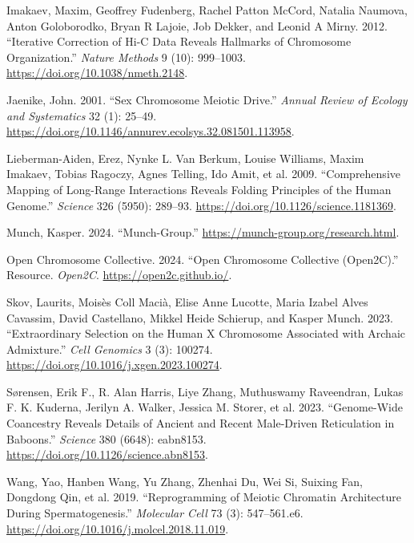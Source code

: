 \documentclass[
  a4paper,
]{scrbook}
\newlength{\cslhangindent}
\newenvironment{CSLReferences}[2] %
 {\begin{list}{}{%
  \setlength{\itemindent}{0pt}
  \setlength{\leftmargin}{0pt}
  \setlength{\parsep}{0pt}
  \ifodd #1
   \setlength{\leftmargin}{\cslhangindent}
   \setlength{\itemindent}{-1\cslhangindent}
  \fi
  \setlength{\itemsep}{#2\baselineskip}}}
 {\end{list}}
\let\oldemph\emph
\renewcommand\emph[1]{\oldemph{\color{gray}#1}}
\begin{document}
\label{refs}
\begin{CSLReferences}{1}{0}
Imakaev, Maxim, Geoffrey Fudenberg, Rachel Patton McCord, Natalia
Naumova, Anton Goloborodko, Bryan R Lajoie, Job Dekker, and Leonid A
Mirny. 2012. {``Iterative Correction of {Hi}-{C} Data Reveals Hallmarks
of Chromosome Organization.''} \emph{Nature Methods} 9 (10): 999--1003.
\url{https://doi.org/10.1038/nmeth.2148}.

Jaenike, John. 2001. {``Sex {Chromosome} {Meiotic} {Drive}.''}
\emph{Annual Review of Ecology and Systematics} 32 (1): 25--49.
\url{https://doi.org/10.1146/annurev.ecolsys.32.081501.113958}.

Lieberman-Aiden, Erez, Nynke L. Van Berkum, Louise Williams, Maxim
Imakaev, Tobias Ragoczy, Agnes Telling, Ido Amit, et al. 2009.
{``Comprehensive {Mapping} of {Long}-{Range} {Interactions} {Reveals}
{Folding} {Principles} of the {Human} {Genome}.''} \emph{Science} 326
(5950): 289--93. \url{https://doi.org/10.1126/science.1181369}.

Munch, Kasper. 2024. {``Munch-Group.''}
\url{https://munch-group.org/research.html}.

Open Chromosome Collective. 2024. {``Open {Chromosome} {Collective}
({Open2C}).''} Resource. \emph{Open2C}. \url{https://open2c.github.io/}.

Skov, Laurits, Moisès Coll Macià, Elise Anne Lucotte, Maria Izabel Alves
Cavassim, David Castellano, Mikkel Heide Schierup, and Kasper Munch.
2023. {``Extraordinary Selection on the Human {X} Chromosome Associated
with Archaic Admixture.''} \emph{Cell Genomics} 3 (3): 100274.
\url{https://doi.org/10.1016/j.xgen.2023.100274}.

Sørensen, Erik F., R. Alan Harris, Liye Zhang, Muthuswamy Raveendran,
Lukas F. K. Kuderna, Jerilyn A. Walker, Jessica M. Storer, et al. 2023.
{``Genome-Wide Coancestry Reveals Details of Ancient and Recent
Male-Driven Reticulation in Baboons.''} \emph{Science} 380 (6648):
eabn8153. \url{https://doi.org/10.1126/science.abn8153}.

Wang, Yao, Hanben Wang, Yu Zhang, Zhenhai Du, Wei Si, Suixing Fan,
Dongdong Qin, et al. 2019. {``Reprogramming of {Meiotic} {Chromatin}
{Architecture} During {Spermatogenesis}.''} \emph{Molecular Cell} 73
(3): 547--561.e6. \url{https://doi.org/10.1016/j.molcel.2018.11.019}.

\end{CSLReferences}

\endgroup


\backmatter
\end{document}
